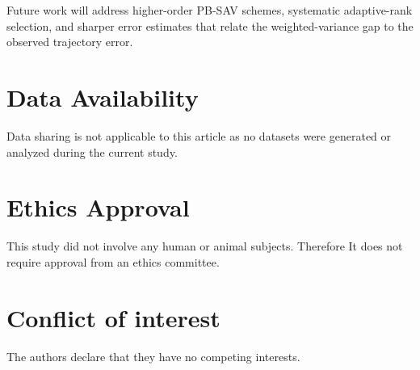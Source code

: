\documentclass[10pt,onefignum,onetabnum,hidelinks]{siamart251216}
\begin{document}
Future work will address higher-order PB-SAV schemes, systematic adaptive-rank selection, and sharper error estimates that relate the weighted-variance gap to the observed trajectory error.

\section*{Data Availability} Data sharing is not applicable to this article as no datasets were generated or analyzed during the current study.

\section*{Ethics Approval} This study did not involve any human or animal subjects. Therefore It does not require approval from an ethics committee.



\section*{Conflict of interest}
The authors declare that they have no competing interests.


\end{document}
